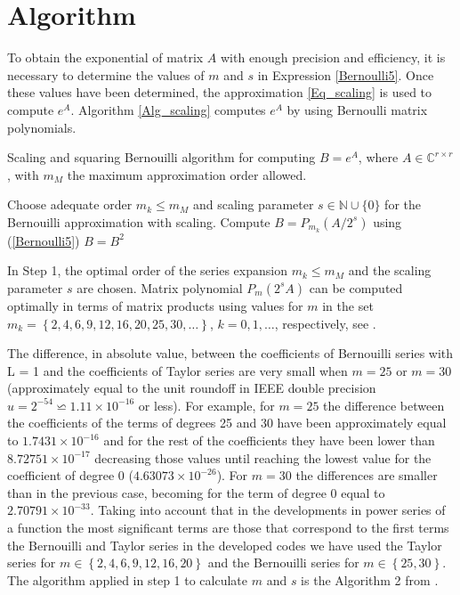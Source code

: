 \section{Algorithm}
To obtain the exponential of matrix $A$ with enough precision and efficiency, it is necessary to determine the values of $m$ and $s$ in  Expression \eqref{Bernoulli5}. Once these values have been determined, the approximation \eqref{Eq_scaling} is used to compute $e^A$. Algorithm \ref{Alg_scaling} computes $e^A$ by using Bernoulli matrix polynomials.

\begin{algorithm}[H]
\caption{Scaling and squaring Bernouilli algorithm for computing $B=e^{A}$,
where $A \in {\mathbb{C}^{r \times r}}$, with $m_{M}$ the maximum approximation order allowed.}
\label{Alg_scaling}
\begin{algorithmic} [1]
\State Choose adequate order $m_k \leqslant {m_{M}}$ and scaling parameter
$s\in \mathbb{N}\cup\{0\}$ for the Bernouilli approximation with scaling.
\State Compute $B = {P_{m_k}}(A/2^{s})$ using (\ref{Bernoulli5})
    \State $B=B^{2}$
 \EndFor
\end{algorithmic}
\end{algorithm}

In Step 1, the optimal order of the series expansion $m_{k}
\leqslant {m_{M}}$ and the scaling parameter $s$ are chosen. Matrix
polynomial $P_{m}(2^{s}A)$ can be computed optimally in terms of
matrix products using values for $m$ in the set
$m_k=\left\{2,4,6,9,12,16, 20,25,30,\ldots\right\}$,
$k=0,1,\ldots$, respectively, see \cite[p. 72--74]{High08}.

The difference, in absolute value, between the coefficients of Bernouilli series  with L = 1 and the coefficients of Taylor series are very small when  $m = 25$ or $m=30$ (approximately equal to the unit roundoff in IEEE double precision $u=2^{-54}\backsimeq 1.11\times 10^{-16}$ or less). For
example, for $m=25$ the difference between the coefficients of the terms of degrees 25 and 30 have been approximately equal to $1.7431\times10^{-16}$ and for the rest of the coefficients they have been lower than $8.72751\times10^{-17}$ decreasing those values until reaching the lowest value for the coefficient of degree 0 ($4.63073\times10^{-26}$). For $m = 30$ the differences are smaller than in the previous case, becoming for the term of degree 0 equal to $2.70791\times10^{-33}$.
Taking into account that in the developments in power series of a function the most significant terms are those that correspond to the first terms the Bernouilli and Taylor series in the developed codes we have used the Taylor series for $m \in \left\{ {2,4,6,9,12,16,20} \right\}$ and the Bernouilli series for $m \in \left\{ {25,30} \right\}$.
The algorithm applied in step 1 to calculate $m$ and $s$ is the Algorithm 2 from \cite{RSID16}.

